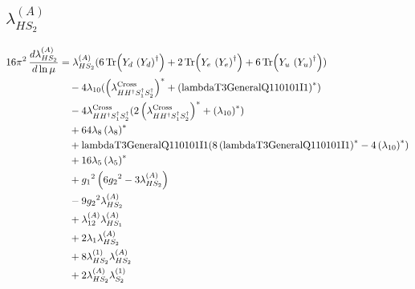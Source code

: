 \documentclass[10pt,a4paper]{article}
\begin{document}
\subsection*{$\lambda_{HS_2}^{(A)}$}
\begin{align*}
16\pi^2\,\frac{d \lambda_{HS_2}^{(A)}}{d\ln\mu} &={\lambda_{HS_2}^{(A)}} (6 \operatorname{Tr}\!\left({Y_d}\,\left({Y_d}\right)^{\dagger}\right)+2 \operatorname{Tr}\!\left({Y_e}\,\left({Y_e}\right)^{\dagger}\right)+6 \operatorname{Tr}\!\left({Y_u}\,\left({Y_u}\right)^{\dagger}\right)) \\
&\quad -4 {\lambda_{10}} (\left({\lambda_{H H^\dagger S_1^\dagger S_2^\dagger}^{\rm Cross}}\right)^{*}+\left(\text{lambdaT3GeneralQ110101I1}\right)^{*}) \\
&\quad -4 {\lambda_{H H^\dagger S_1^\dagger S_2^\dagger}^{\rm Cross}} (2 \left({\lambda_{H H^\dagger S_1^\dagger S_2^\dagger}^{\rm Cross}}\right)^{*}+\left({\lambda_{10}}\right)^{*}) \\
&\quad +64 {\lambda_{8}} \left({\lambda_{8}}\right)^{*} \\
&\quad +\text{lambdaT3GeneralQ110101I1} (8 \left(\text{lambdaT3GeneralQ110101I1}\right)^{*}-4 \left({\lambda_{10}}\right)^{*}) \\
&\quad +16 {\lambda_5} \left({\lambda_5}\right)^{*} \\
&\quad +{g_1}^2 \left(6 {g_2}^2-3 {\lambda_{HS_2}^{(A)}}\right) \\
&\quad -9 {g_2}^2 {\lambda_{HS_2}^{(A)}} \\
&\quad +{\lambda_{12}^{(A)}} {\lambda_{HS_1}^{(A)}} \\
&\quad +2 {\lambda_1} {\lambda_{HS_2}^{(A)}} \\
&\quad +8 {\lambda_{HS_2}^{(1)}} {\lambda_{HS_2}^{(A)}} \\
&\quad +2 {\lambda_{HS_2}^{(A)}} {\lambda_{S_2}^{(1)}} \\
\end{align*}
\end{document}
